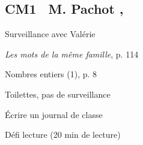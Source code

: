 \documentclass{article}
\begin{document}
\reversemarginpar

		
\subsection*{CM1 \ M. Pachot \qquad {} \sep}
\aam Surveillance avec Valérie

\ort\ham \textit{Les mots de la même famille}, p. 114

\nec\han Nombres entiers (1), p. 8

\ram Toilettes, pas de surveillance

\ppd\amr Écrire un journal de classe

\dev Défi lecture (20 min de lecture)

\fmm
\end{document}
